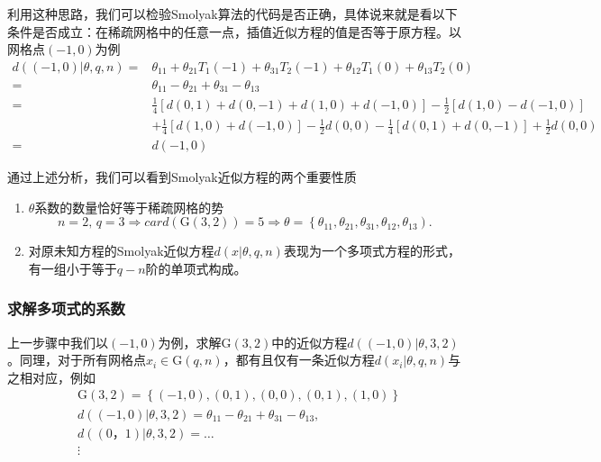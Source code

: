利用这种思路，我们可以检验Smolyak算法的代码是否正确，具体说来就是看以下条件是否成立：在稀疏网格中的任意一点，插值近似方程的值是否等于原方程。以网格点$(-1,0)$为例
\begin{equation*}
\begin{split}
  d \left( (-1,0) | \theta, q, n \right)
   = & \theta_{11} + \theta_{21} T_{1}(-1) + \theta_{31} T_{2}(-1) + \theta_{12} T_{1}(0) + \theta_{13} T_{2}(0) \\
   = & \theta_{11} - \theta_{21} + \theta_{31} - \theta_{13} \\
   = & \frac{1}{4}
  \left[
  d(0,1) + d(0,-1) + d(1, 0) + d(-1,0)
  \right] -
  \frac{1}{2}
  \left[
  d(1,0) - d(-1,0)
  \right] \\
  & + \frac{1}{4}
  \left[
  d(1,0) + d(-1,0)
  \right]
  - \frac{1}{2} d(0,0)
  - \frac{1}{4}
  \left[
  d(0,1) + d(0,-1)
  \right]
  + \frac{1}{2} d(0,0) \\
  = & d(-1,0)
\end{split}
\end{equation*}

通过上述分析，我们可以看到Smolyak近似方程的两个重要性质
\begin{enumerate}
  \item $\theta$系数的数量恰好等于稀疏网格的势
  \begin{equation*}
    n=2, \, q=3 \Rightarrow card \left( \mathrm{G}(3,2) \right) = 5 \Rightarrow
    \theta = \left\{ \theta_{11}, \theta_{21}, \theta_{31}, \theta_{12}, \theta_{13} \right).
  \end{equation*}
  \item 对原未知方程的Smolyak近似方程$d(x | \theta, q, n)$表现为一个多项式方程的形式，有一组小于等于$q-n$阶的单项式构成。
\end{enumerate}

\subsubsection{求解多项式的系数}
\label{sec:pj-sparsity-estimation}
上一步骤中我们以$(-1,0)$为例，求解$\mathrm{G}(3,2)$中的近似方程$d \left( (-1,0) | \theta, 3, 2 \right)$。同理，对于所有网格点$x_{i} \in \mathrm{G}(q,n)$，都有且仅有一条近似方程$d \left( x_{i} | \theta, q, n \right)$与之相对应，例如
\begin{equation*}
  \begin{split}
    & \mathrm{G}(3,2) = \left\{ (-1,0), (0,1), (0,0), (0,1), (1,0) \right\} \\
    & d \left( (-1, 0) | \theta, 3, 2 \right)  = \theta_{11} - \theta_{21} + \theta_{31} - \theta_{13}, \\
    & d \left( ( 0， 1) | \theta, 3, 2 \right)  = \ldots \\
    & \vdots
  \end{split}
\end{equation*}

